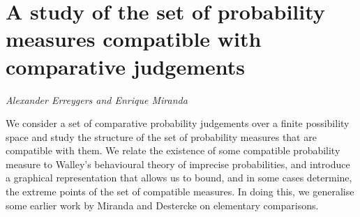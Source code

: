 \documentclass[../booklet.tex]{subfiles}
\begin{document}
\section[A study of the set of probability measures compatible with comparative judgements. {\it Alexander Erreygers and Enrique Miranda}]{A study of the set of probability measures compatible with comparative judgements}
 

\begin{center}
  {\it Alexander Erreygers and Enrique Miranda}
\end{center}

\vskip 0.8cm


We consider a set of comparative probability judgements over a finite possibility space and study the structure of the set of probability measures that are compatible with them.
We relate the existence of some compatible probability measure to Walley's behavioural theory of imprecise probabilities, and introduce a graphical representation that allows us to bound, and in some cases determine, the extreme points of the set of compatible measures.
In doing this, we generalise some earlier work by Miranda and Destercke on elementary comparisons.

\end{document}
